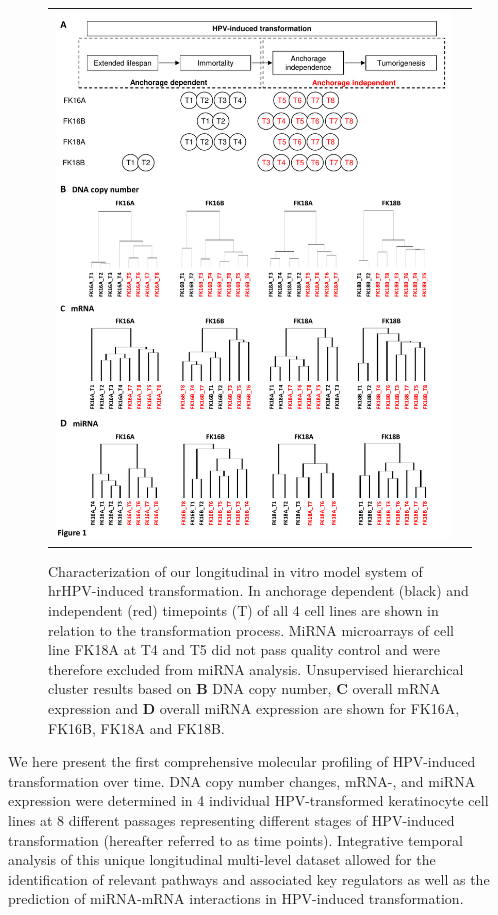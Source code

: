 \begin{figure}[h!]
\centering
\begin{tabular}{cc} 
\includegraphics[scale=0.62]{Figure1.pdf}
\end{tabular}
\caption{Characterization of our longitudinal in vitro model system of hrHPV-induced transformation. In anchorage dependent (black) and independent (red) timepoints (T) of all 4 cell lines are shown in relation to the transformation process. MiRNA microarrays of cell line FK18A at T4 and T5 did not pass quality control and were therefore excluded from miRNA analysis. Unsupervised hierarchical cluster results based on \textbf{B} DNA copy number, \textbf{C} overall mRNA expression and \textbf{D} overall miRNA expression are shown for FK16A, FK16B, FK18A and FK18B.}
\label{fig:figure51}
\end{figure}

We here present the first comprehensive molecular profiling of HPV-induced transformation over time. DNA copy number changes, mRNA-, and miRNA expression were determined in 4 individual HPV-transformed keratinocyte cell lines at 8 different passages representing different stages of HPV-induced transformation (hereafter referred to as time points). Integrative temporal analysis of this unique longitudinal multi-level dataset allowed for the identification of relevant pathways and associated key regulators as well as the prediction of miRNA-mRNA interactions in HPV-induced transformation.

